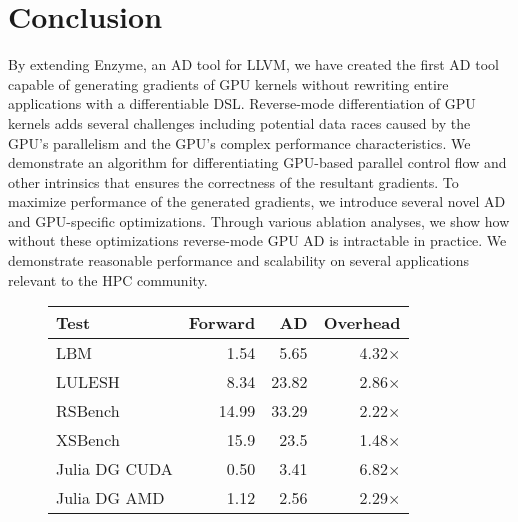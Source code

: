 \section{Conclusion}
\label{sec:conclusion}

By extending Enzyme, an AD tool for LLVM, we have created the first AD tool capable of generating gradients of GPU kernels without rewriting entire applications with a differentiable DSL. Reverse-mode differentiation of GPU kernels adds several challenges including potential data races caused by the GPU's parallelism and the GPU's complex performance characteristics. We demonstrate an algorithm for differentiating GPU-based parallel control flow and other intrinsics that ensures the correctness of the resultant gradients. To maximize performance of the generated gradients, we introduce several novel AD and GPU-specific optimizations. Through various ablation analyses, we show how without these optimizations reverse-mode GPU AD is intractable in practice.  We demonstrate reasonable performance and scalability on several applications relevant to the HPC community.


\begin{figure}
    \centering
    \begin{tabular}{l|r|r|r}
         Test & Forward & AD & Overhead\\\hline
         LBM & 1.54 & 5.65 & 4.32$\times$\\
         LULESH & 8.34 & 23.82 & 2.86$\times$\\
         RSBench & 14.99 & 33.29 & 2.22$\times$\\
         XSBench & 15.9 & 23.5 & 1.48$\times$\\
         \hline
         Julia DG CUDA & 0.50 & 3.41 & 6.82$\times$\\
         Julia DG AMD & 1.12 & 2.56 & 2.29$\times$\\
    \end{tabular}
    \caption{}
    \label{fig:comptime}
\end{figure}

